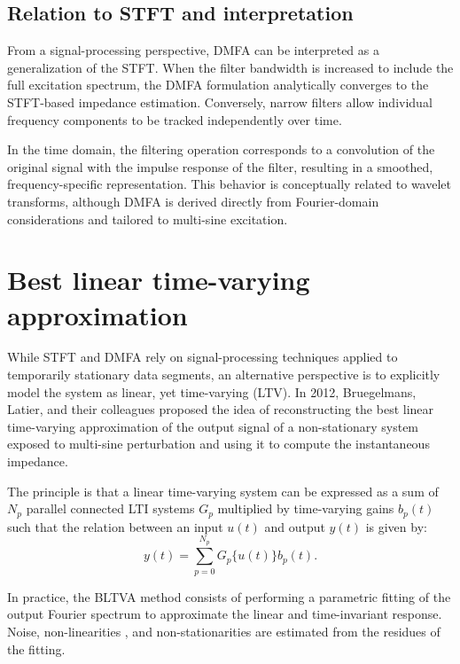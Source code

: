 \subsection{Relation to STFT and interpretation}

From a signal-processing perspective, DMFA can be interpreted as a generalization of the STFT.
When the filter bandwidth is increased to include the full excitation spectrum, the DMFA formulation analytically converges to the STFT-based impedance estimation.
Conversely, narrow filters allow individual frequency components to be tracked independently over time.

In the time domain, the filtering operation corresponds to a convolution of the original signal with the impulse response of the filter, resulting in a smoothed, frequency-specific representation.
This behavior is conceptually related to wavelet transforms, although DMFA is derived directly from Fourier-domain considerations and tailored to multi-sine excitation.

\section{Best linear time-varying approximation}

While STFT and DMFA rely on signal-processing techniques applied to temporarily stationary data segments, an alternative perspective is to explicitly model the system as linear, yet time-varying (LTV).
In 2012, Bruegelmans, Latier, and their colleagues proposed the idea of reconstructing the best linear time-varying approximation of the output signal of a non-stationary system exposed to multi-sine perturbation \cite{breugelmansOddRandomPhase2012} and using it to compute the instantaneous impedance.

The principle is that a linear time-varying system can be expressed as a sum of $N_p$ parallel connected LTI systems $G_p$ multiplied by time-varying gains $b_p(t)$ such that the relation between an input $u(t)$ and output $y(t)$ is given by:
\begin{equation}
    y(t) = \sum _{p=0}^{N_p} G_p\{u(t)\}b_p(t).
\end{equation}

In practice, the BLTVA method consists of performing a parametric fitting of the output Fourier spectrum to approximate the linear and time-invariant response. 
Noise, non-linearities \cite{hallemansNonparametricIdentificationLinear2020, hallemansDetectionClassificationQuantification2021}, and non-stationarities \cite{hallemansBestLinearTimeVarying2021} are estimated from the residues of the fitting.

